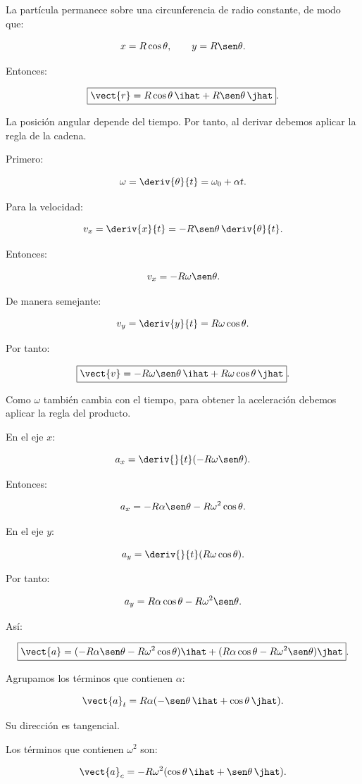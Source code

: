 \begin{explicacion}
La partícula permanece sobre una circunferencia de radio
constante, de modo que:

\[
x=R\cos\theta,
\qquad
y=R\sen\theta.
\]

Entonces:

\[
\boxed{
\vect{r}
=R\cos\theta\,\ihat+R\sen\theta\,\jhat
}.
\]

La posición angular depende del tiempo. Por tanto, al derivar
debemos aplicar la regla de la cadena.

Primero:

\[
\omega=\deriv{\theta}{t}=\omega_0+\alpha t.
\]

Para la velocidad:

\[
v_x=\deriv{x}{t}
=-R\sen\theta\,\deriv{\theta}{t}.
\]

Entonces:

\[
v_x=-R\omega\sen\theta.
\]

De manera semejante:

\[
v_y=\deriv{y}{t}
=R\omega\cos\theta.
\]

Por tanto:

\[
\boxed{
\vect{v}
=-R\omega\sen\theta\,\ihat
+R\omega\cos\theta\,\jhat
}.
\]

Como \(\omega\) también cambia con el tiempo, para obtener
la aceleración debemos aplicar la regla del producto.

En el eje \(x\):

\[
a_x=\deriv{}{t}(-R\omega\sen\theta).
\]

Entonces:

\[
a_x=-R\alpha\sen\theta-R\omega^2\cos\theta.
\]

En el eje \(y\):

\[
a_y=\deriv{}{t}(R\omega\cos\theta).
\]

Por tanto:

\[
a_y=R\alpha\cos\theta-R\omega^2\sen\theta.
\]

Así:

\[
\boxed{
\vect{a}
=
(-R\alpha\sen\theta-R\omega^2\cos\theta)\ihat
+
(R\alpha\cos\theta-R\omega^2\sen\theta)\jhat
}.
\]

Agrupamos los términos que contienen \(\alpha\):

\[
\vect{a}_t
=
R\alpha(-\sen\theta\,\ihat+\cos\theta\,\jhat).
\]

Su dirección es tangencial.

Los términos que contienen \(\omega^2\) son:

\[
\vect{a}_c
=
-R\omega^2(\cos\theta\,\ihat+\sen\theta\,\jhat).
\]


\end{explicacion}
